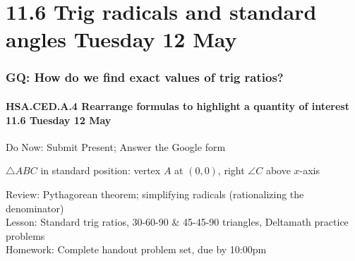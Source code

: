 \documentclass{beamer}
\begin{document}
\section{11.6 Trig radicals and standard angles Tuesday 12 May} 
\frame
{
  \frametitle{GQ: How do we find exact values of trig ratios?}
  \framesubtitle{HSA.CED.A.4 Rearrange formulas to highlight a quantity of interest \hfill \alert{11.6 Tuesday 12 May}}

  \begin{block}{Do Now: Submit Present; Answer the Google form} %
    \begin{multicols}{2}
      $\triangle ABC$ in standard position: vertex $A$ at $(0,0)$, right $\angle C$ above $x$-axis
  \end{multicols}
    \end{block}
    Review: Pythagorean theorem; simplifying radicals (rationalizing the denominator)\\[0.20cm]
    Lesson: Standard trig ratios, 30-60-90 \& 45-45-90 triangles,
    Deltamath practice problems \\[0.20cm]
    Homework: Complete handout problem set, due by 10:00pm}
\end{document}
